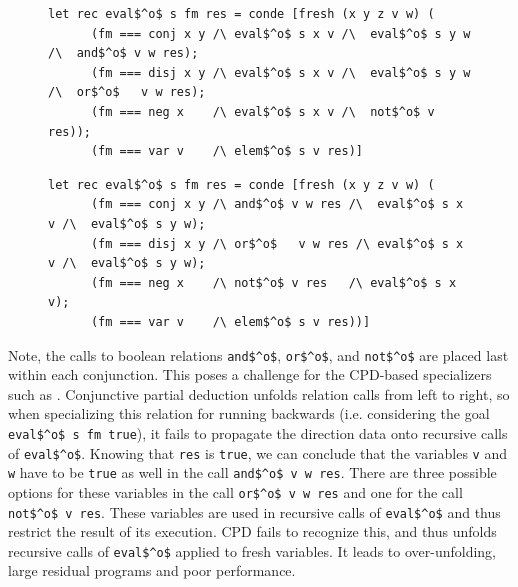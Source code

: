 \begin{figure}[!t]
  \centering
  \begin{minipage}{0.95\textwidth}
    \begin{lstlisting}[label={eval:last}, caption={Evaluator of formulas with boolean operation last}, captionpos=b, frame=tb]
  let rec eval$^o$ s fm res = conde [fresh (x y z v w) (
      (fm === conj x y /\ eval$^o$ s x v /\  eval$^o$ s y w /\  and$^o$ v w res);
      (fm === disj x y /\ eval$^o$ s x v /\  eval$^o$ s y w /\  or$^o$   v w res);
      (fm === neg x    /\ eval$^o$ s x v /\  not$^o$ v res));
      (fm === var v    /\ elem$^o$ s v res)]
    \end{lstlisting}
  \end{minipage}
  \begin{minipage}{0.95\textwidth}
    \begin{lstlisting}[label={eval:fst}, caption={Evaluator of formulas with boolean operation second}, captionpos=b, frame=tb]
  let rec eval$^o$ s fm res = conde [fresh (x y z v w) (
      (fm === conj x y /\ and$^o$ v w res /\  eval$^o$ s x v /\  eval$^o$ s y w);
      (fm === disj x y /\ or$^o$   v w res /\ eval$^o$ s x v /\  eval$^o$ s y w);
      (fm === neg x    /\ not$^o$ v res   /\ eval$^o$ s x v);
      (fm === var v    /\ elem$^o$ s v res))]
    \end{lstlisting}
  \end{minipage}
\end{figure}

Note, the calls to boolean relations \lstinline{and$^o$}, \lstinline{or$^o$}, and \lstinline{not$^o$} are placed last within each conjunction.
This poses a challenge for the CPD-based specializers such as \ecce.
Conjunctive partial deduction unfolds relation calls from left to right, so when specializing this relation for running backwards (i.e. considering the goal \lstinline{eval$^o$ s fm true}), it fails to propagate the direction data onto recursive calls of \lstinline{eval$^o$}.
Knowing that \lstinline{res} is \lstinline{true}, we can conclude that the variables \lstinline{v} and \lstinline{w} have to be \lstinline{true} as well in the call \lstinline{and$^o$ v w res}.
There are three possible options for these variables in the call \lstinline{or$^o$ v w res} and one for the call \lstinline{not$^o$ v res}.
These variables are used in recursive calls of \lstinline{eval$^o$} and thus restrict the result of its execution.
CPD fails to recognize this, and thus unfolds recursive calls of \lstinline{eval$^o$} applied to fresh variables.
It leads to over-unfolding, large residual programs and poor performance.

